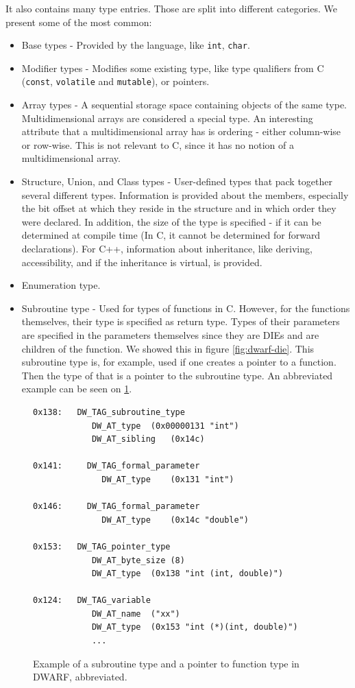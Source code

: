 It also contains many type entries. Those are split into different categories.
We present some of the most common:
\begin{itemize}
    \item Base types - Provided by the language, like \texttt{int},
        \texttt{char}.
    \item Modifier types - Modifies some existing type, like type qualifiers
        from C (\texttt{const}, \texttt{volatile} and \texttt{mutable}), or
        pointers.
    \item Array types - A sequential storage space containing objects of the
        same type. Multidimensional arrays are considered a special type.
        An interesting attribute that a multidimensional array has is ordering -
        either column-wise or row-wise. This is not relevant to C, since it has no
        notion of a multidimensional array.
    \item Structure, Union, and Class types - User-defined types that pack
        together several different types. Information is provided about the
        members, especially the bit offset at which they reside in the structure
        and in which order they were declared. In addition, the size of the type
        is specified - if it can be determined at compile time (In C, it cannot
        be determined for forward declarations). For C++, information about
        inheritance, like deriving, accessibility, and if the inheritance is
        virtual, is provided.
    \item Enumeration type.
    \item Subroutine type - Used for types of functions in C. However, for the
        functions themselves, their type is specified as return type. Types of
        their parameters are specified in the parameters themselves since they
        are DIEs and are children of the function. We showed this in figure
        \ref{fig:dwarf-die}. This subroutine type is, for example, used if one
        creates a pointer to a function. Then the type of that is a pointer
        to the subroutine type. An abbreviated example can be seen on
        \ref{fig:dwarf-ptr-to-fun}.
\end{itemize}

\begin{figure}
    \begin{lstlisting}
0x138:   DW_TAG_subroutine_type
            DW_AT_type	(0x00000131 "int")
            DW_AT_sibling	(0x14c)

0x141:     DW_TAG_formal_parameter
              DW_AT_type	(0x131 "int")

0x146:     DW_TAG_formal_parameter
              DW_AT_type	(0x14c "double")

0x153:   DW_TAG_pointer_type
            DW_AT_byte_size	(8)
            DW_AT_type	(0x138 "int (int, double)")

0x124:   DW_TAG_variable
            DW_AT_name	("xx")
            DW_AT_type	(0x153 "int (*)(int, double)")
            ...
    \end{lstlisting}
    \caption{Example of a subroutine type and a pointer to function type in
    DWARF, abbreviated.}
    \label{fig:dwarf-ptr-to-fun}
\end{figure}

